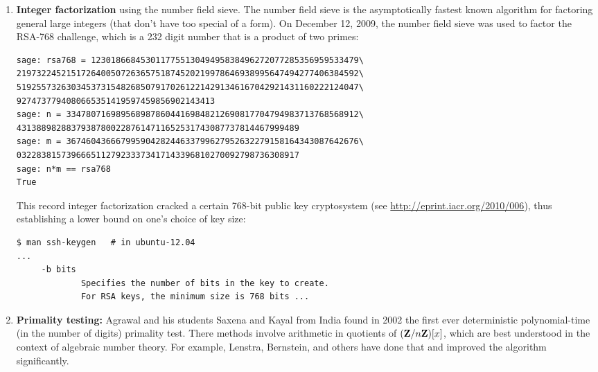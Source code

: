\begin{enumerate}
\item {\bf Integer factorization} using the number field sieve.  The
number field sieve is the asymptotically fastest known algorithm for
factoring general large integers (that don't have too special of a
form).  On December 12, 2009, the number field sieve was used to
factor the RSA-768 challenge, which is a 232 digit number that is a product of two primes:\\
\begin{lstlisting}
sage: rsa768 = 123018668453011775513049495838496272077285356959533479\
219732245215172640050726365751874520219978646938995647494277406384592\
519255732630345373154826850791702612214291346167042921431160222124047\
9274737794080665351419597459856902143413
sage: n = 33478071698956898786044169848212690817704794983713768568912\
431388982883793878002287614711652531743087737814467999489
sage: m = 36746043666799590428244633799627952632279158164343087642676\
032283815739666511279233373417143396810270092798736308917
sage: n*m == rsa768
True
\end{lstlisting}

This record integer factorization cracked a certain 768-bit public key
cryptosystem (see \url{http://eprint.iacr.org/2010/006}), thus
establishing a lower bound on one's choice of key size:
\begin{verbatim}
$ man ssh-keygen   # in ubuntu-12.04
...
     -b bits
             Specifies the number of bits in the key to create.  
             For RSA keys, the minimum size is 768 bits ...
\end{verbatim}


\item {\bf Primality testing:} Agrawal and his students Saxena and Kayal from
India found in 2002 the first ever deterministic
polynomial-time (in the number of digits) primality test.  There
methods involve arithmetic in quotients of $(\mathbf{Z}/n\mathbf{Z})[x]$, which are
best understood in the context of algebraic number theory.  For
example, Lenstra, Bernstein, and others have done that and improved
the algorithm significantly.


\end{enumerate}
